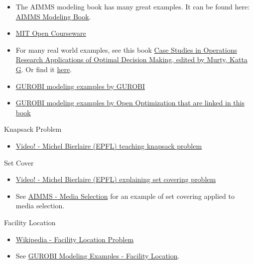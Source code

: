 \begin{resource}



\begin{itemize}
\item The AIMMS modeling book has many great examples.  It can be found here: \href{https://www.aimms.com/english/developers/resources/manuals/optimization-modeling}{AIMMS Modeling Book}.
\item \href{http://web.mit.edu/15.053/www/AMP-Chapter-09.pdf}{MIT Open Courseware}
\item  For many real world examples, see this book \href{https://link-springer-com.ezproxy.lib.vt.edu/book/10.1007/978-1-4939-1007-6}{
Case Studies in Operations Research
Applications of Optimal Decision Making, edited by  Murty, Katta G}.
Or find it \href{https://www.springer.com/gp/book/9781493910069}{here}.
\item \href{https://github.com/Gurobi/modeling-examples}{GUROBI modeling examples by GUROBI}
\item \href{https://github.com/open-optimization/open-optimization-or-examples/tree/master/integer-programming}{GUROBI modeling examples by Open Optimization that are linked in this book}
\end{itemize}

Knapsack Problem
\begin{itemize}
\item \href{https://www.youtube.com/watch?v=GteOoMGUOdY}{Video! - Michel Bierlaire (EPFL) teaching knapsack problem}
\end{itemize}

Set Cover
\begin{itemize}
\item \href{https://www.youtube.com/watch?v=cjSeHSjPmsk}{Video! - Michel Bierlaire (EPFL) explaining set covering problem}
\item See \href{https://download.aimms.com/aimms/download/manuals/AIMMS3OM_MediaSelection.pdf}{AIMMS - Media Selection} for an example of set covering applied to media selection.
\end{itemize}

Facility Location
\begin{itemize}
\item \href{https://en.wikipedia.org/wiki/Facility_location_problem}{Wikipedia - Facility Location Problem}
\item See \href{https://github.com/Gurobi/modeling-examples/tree/master/facility_location}{GUROBI Modeling Examples - Facility Location}.
\end{itemize}



\end{resource}
